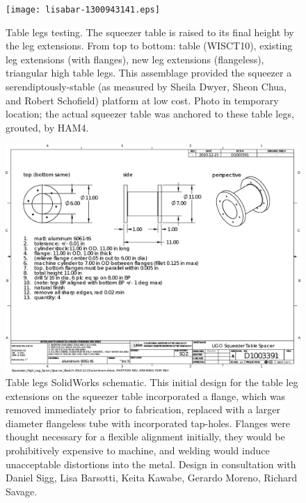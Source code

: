 \begin{figure}
\begin{center}
\texttt{[image: lisabar-1300943141.eps]}
\caption{Table legs testing. The squeezer table is raised to its final height by the leg extensions. From top to bottom: table (WISCT10), existing leg extensions (with flanges), new leg extensions (flangeless), triangular high table legs. This assemblage provided the squeezer a serendiptously-stable (as measured by Sheila Dwyer, Sheon Chua, and Robert Schofield) platform at low cost. Photo in temporary location; the actual squeezer table was anchored to these table legs, grouted, by HAM4.
}
\label{table_leg_testing}
\end{center}
\end{figure}




\begin{figure}
\begin{center}
\includegraphics[width=0.6\paperwidth]{Squeezer_High_Leg_Spool_Spacer_2010-12-23_aluminum.eps}
\caption{Table legs SolidWorks schematic. This initial design for the table leg extensions on the squeezer table incorporated a flange, which was removed immediately prior to fabrication, replaced with a larger diameter flangeless tube with incorporated tap-holes. Flanges were thought necessary for a flexible alignment initially, they would be prohibitively expensive to machine, and welding would induce unacceptable distortions into the metal. Design in consultation with Daniel Sigg, Lisa Barsotti, Keita Kawabe, Gerardo Moreno, Richard Savage.
}
\label{spacer_legs_figure}
\end{center}
\end{figure}



